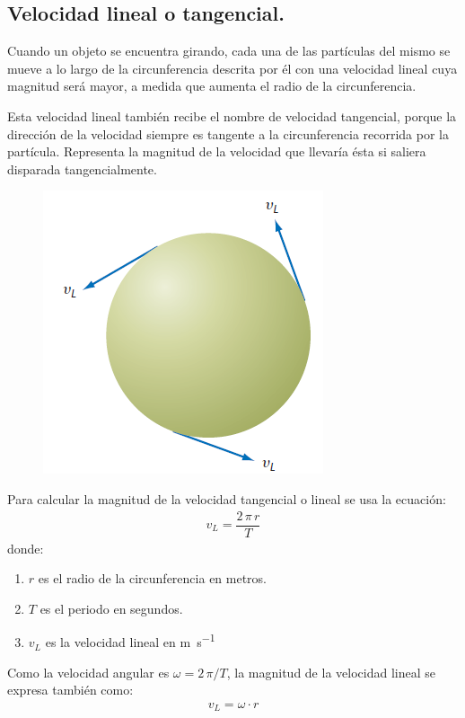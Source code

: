 \documentclass[14pt]{extarticle}
\begin{document}
\subsection{Velocidad lineal o tangencial.}

Cuando un objeto se encuentra girando,  cada una de las partículas del mismo se mueve a lo largo de la circunferencia descrita por él con una velocidad lineal cuya magnitud será mayor, a medida que aumenta el radio de la circunferencia.

Esta velocidad lineal también recibe el nombre de velocidad tangencial, porque la dirección de la velocidad siempre es tangente a la circunferencia recorrida por la partícula. Representa la magnitud de la velocidad que llevaría ésta si saliera disparada tangencialmente.
\begin{figure}[H]
    \centering
    \includegraphics[scale=0.75]{Imagenes/Movimiento_Circular_03.png}
\end{figure}

Para calcular la magnitud de la velocidad tangencial o lineal se usa la ecuación:
\begin{align*}
v_{L} = \dfrac{2 \, \pi \, r}{T}
\end{align*}
donde:
\begin{enumerate}[label=\alph*)]
\item $r$ es el radio de la circunferencia en metros.
\item $T$ es el periodo en segundos.
\item $v_{L}$ es la velocidad lineal en \unit{\meter\per\second}
\end{enumerate}

Como la velocidad angular es $\omega = 2 \, \pi /T$, la magnitud de la velocidad lineal se expresa también como:
\begin{align*}
v_{L} = \omega \cdot r
\end{align*}
\end{document}

